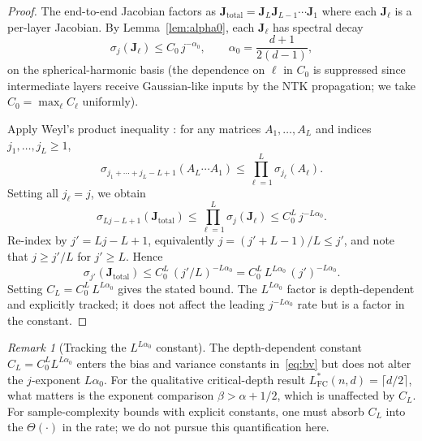 \documentclass[12pt]{amsart}
\theoremstyle{definition}
\theoremstyle{remark}
\newtheorem{remark}[theorem]{Remark}
\newcommand{\bJ}{\mathbf{J}}
\begin{document}
\begin{proof}
The end-to-end Jacobian factors as
$\bJ_{\mathrm{total}} = \bJ_{L}\bJ_{L-1}\cdots\bJ_{1}$ where each
$\bJ_{\ell}$ is a per-layer Jacobian. By Lemma~\ref{lem:alpha0}, each
$\bJ_{\ell}$ has spectral decay
\begin{equation}\label{eq:per-layer-sigma}
  \sigma_{j}(\bJ_{\ell}) \leq C_{0}\, j^{-\alpha_{0}},
  \qquad \alpha_{0} = \frac{d+1}{2(d-1)},
\end{equation}
on the spherical-harmonic basis (the dependence on $\ell$ in $C_{0}$ is
suppressed since intermediate layers receive Gaussian-like inputs by the
NTK propagation; we take $C_{0} = \max_{\ell} C_{\ell}$ uniformly).

Apply Weyl's product inequality \cite[Theorem 3.3.14]{HornJohnson2013}:
for any matrices $A_{1},\ldots,A_{L}$ and indices $j_{1},\ldots,j_{L}\geq 1$,
\[
  \sigma_{j_{1}+\cdots+j_{L}-L+1}(A_{L}\cdots A_{1})
  \le \prod_{\ell=1}^{L} \sigma_{j_{\ell}}(A_{\ell}).
\]
Setting all $j_{\ell} = j$, we obtain
\[
  \sigma_{Lj-L+1}(\bJ_{\mathrm{total}})
  \leq \prod_{\ell=1}^{L} \sigma_{j}(\bJ_{\ell})
  \leq C_{0}^{L}\, j^{-L\alpha_{0}}.
\]
Re-index by $j' = Lj - L + 1$, equivalently $j = (j'+L-1)/L \le j'$, and
note that $j \ge j'/L$ for $j' \ge L$. Hence
\[
  \sigma_{j'}(\bJ_{\mathrm{total}})
  \leq C_{0}^{L}\, (j'/L)^{-L\alpha_{0}}
  = C_{0}^{L}\, L^{L\alpha_{0}}\, (j')^{-L\alpha_{0}}.
\]
Setting $C_{L} = C_{0}^{L}\, L^{L\alpha_{0}}$ gives the stated bound. The
$L^{L\alpha_{0}}$ factor is depth-dependent and explicitly tracked; it
does not affect the leading $j^{-L\alpha_{0}}$ rate but is a factor in
the constant.
\end{proof}

\begin{remark}[Tracking the $L^{L\alpha_{0}}$ constant]\label{rem:depth-const}
The depth-dependent constant $C_{L} = C_{0}^{L} L^{L\alpha_{0}}$ enters
the bias and variance constants in~\eqref{eq:bv} but does not alter the
$j$-exponent $L\alpha_{0}$. For the qualitative critical-depth result
$L^{*}_{\mathrm{FC}}(n,d) = \lceil d/2 \rceil$, what matters is the
exponent comparison $\beta > \alpha + 1/2$, which is unaffected by
$C_{L}$. For sample-complexity bounds with explicit constants, one must
absorb $C_{L}$ into the $\Theta(\cdot)$ in the rate; we do not pursue this
quantification here.
\end{remark}
\end{document}
